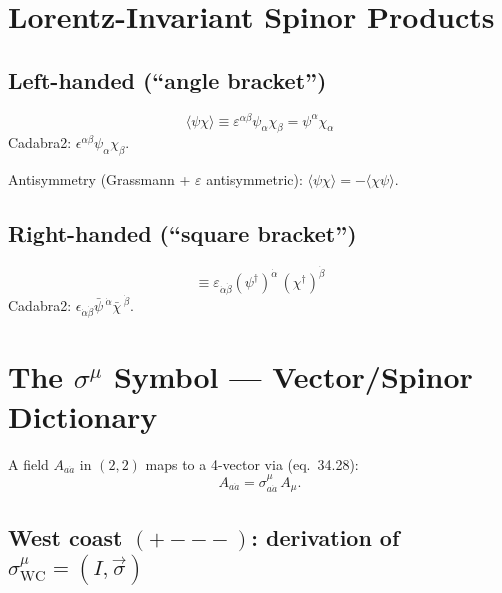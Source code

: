 \documentclass[12pt]{article}
\theoremstyle{remark}
\newcommand{\psidag}{\psi^{\dagger}}
\begin{document}
\section{Lorentz-Invariant Spinor Products}

\subsection{Left-handed (``angle bracket'')}
\begin{equation}
  \langle\psi\chi\rangle
  \equiv \varepsilon^{\alpha\beta}\psi_\alpha\chi_\beta
  = \psi^\alpha\chi_\alpha
  \tag{35.21 preview}
\end{equation}
Cadabra2: $\epsilon^{\alpha \beta} \psi_{\alpha} \chi_{\beta}$.

Antisymmetry (Grassmann + $\varepsilon$ antisymmetric):
$\langle\psi\chi\rangle = -\langle\chi\psi\rangle$.

\subsection{Right-handed (``square bracket'')}
\begin{equation}
  [\psidag\,\chi^{\dagger}]
  \equiv \varepsilon_{\dot{\alpha}\dot{\beta}}
         (\psidag)^{\dot{\alpha}}\,(\chi^{\dagger})^{\dot{\beta}}
\end{equation}
Cadabra2: $\epsilon_{\dot{\alpha} \dot{\beta}} \bar{\psi}\,^{\dot{\alpha}} \bar{\chi}\,^{\dot{\beta}}$.

\section{The \texorpdfstring{$\sigma^\mu$}{sigma\^mu} Symbol ---
         Vector/Spinor Dictionary}

A field $A_{a\dot{a}}$ in $(2,2)$ maps to a 4-vector via (eq.~34.28):
\begin{equation}
  A_{a\dot{a}} = \sigma^\mu_{a\dot{a}}\,A_\mu.
  \tag{34.28}
\end{equation}

\subsection{West coast \texorpdfstring{$(+{-}{-}{-})$}{(+---)}: derivation of
  \texorpdfstring{$\sigma^\mu_{\mathrm{WC}} = (I,\vec{\sigma})$}{sigma\^mu WC}}
\end{document}
